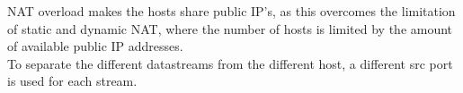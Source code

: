 NAT overload makes the hosts share public IP's, as this overcomes the limitation of static and dynamic NAT, where the number of hosts is limited by the amount of available public IP addresses. \\
To separate the different datastreams from the different host, a different src port is used for each stream.
